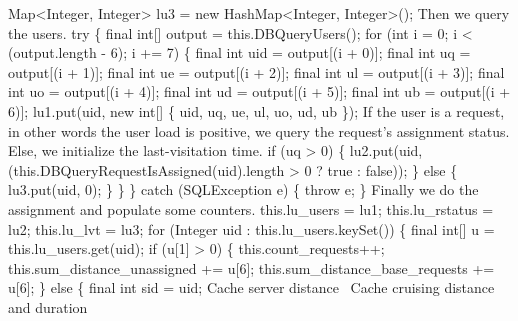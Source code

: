   Map<Integer, Integer>             lu3 = new HashMap<Integer, Integer>();
\nwendcode{}\nwdocspar
{\small Then we query the users.}
\nwenddocs{}\plusendmoddef
  try \{
    final int[] output = this.DBQueryUsers();
    for (int i = 0; i < (output.length - 6); i += 7) \{
      final int uid = output[(i + 0)];
      final int  uq = output[(i + 1)];
      final int  ue = output[(i + 2)];
      final int  ul = output[(i + 3)];
      final int  uo = output[(i + 4)];
      final int  ud = output[(i + 5)];
      final int  ub = output[(i + 6)];
      lu1.put(uid, new int[] \{ uid, uq, ue, ul, uo, ud, ub \});
\nwendcode{}\nwdocspar
{\small If the user is a request, in other words the user load is positive,
we query the request's assignment status. Else, we initialize the last-visitation time.}
\nwenddocs{}\plusendmoddef
      if (uq > 0) \{
        lu2.put(uid, (this.DBQueryRequestIsAssigned(uid).length > 0 ? true : false));
      \} else \{
        lu3.put(uid, 0);
      \}
    \}
  \} catch (SQLException e) \{
    throw e;
  \}
\nwendcode{}\nwdocspar
{\small Finally we do the assignment and populate some counters.}
\nwenddocs{}\plusendmoddef
  this.lu_users   = lu1;
  this.lu_rstatus = lu2;
  this.lu_lvt     = lu3;
  for (Integer uid : this.lu_users.keySet()) \{
    final int[] u = this.lu_users.get(uid);
    if (u[1] > 0) \{
      this.count_requests++;
      this.sum_distance_unassigned += u[6];
      this.sum_distance_base_requests += u[6];
    \} else \{
      final int sid = uid;
      \LA{}Cache server distance~{\nwtagstyle{}}\RA{}
      \LA{}Cache cruising distance and duration~{\nwtagstyle{}}\RA{}
